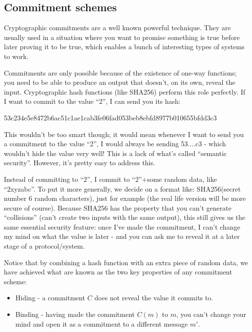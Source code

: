 \documentclass[10pt,a4paper]{article}
\providecommand{\tightlist}{%
  \setlength{\itemsep}{0pt}\setlength{\parskip}{0pt}}
\begin{document}
\hypertarget{commitment-schemes}{%
\subsection[Commitment
schemes]{\texorpdfstring{\protect\hypertarget{anchor-14}{}{}Commitment
schemes}{Commitment schemes}}\label{commitment-schemes}}

Cryptographic commitments are a well known powerful technique. They are
usually used in a situation where you want to promise something is true
before later proving it to be true, which enables a bunch of interesting
types of systems to work.

Commitments are only possible because of the existence of one-way
functions; you need to be able to produce an output that doesn't, on its own, reveal the input.
Cryptographic hash functions (like SHA256) perform this role perfectly. If I want to commit to the value ``2'', I can send you its hash:

53c234e5e8472b6ac51c1ae1cab3fe06fad053beb8ebfd8977b010655bfdd3c3

This wouldn't be too smart though; it would mean whenever I want to send
you a commitment to the value ``2'', I would always be sending 53....c3 - which wouldn't hide
the value very well! This is a lack of what's called ``semantic security''. However, it's pretty easy to address this.

Instead of committing to ``2'', I commit to ``2''+some random data, like
``2xyzabc''. To put it more generally, we decide on a format like: SHA256(secret number
\textbar{}\textbar{} 6 random characters), just for example (the real life version will be more secure of course). Because SHA256 has the property that you can't generate ``collisions'' (can't create two inputs with the same output), this still gives us the same essential security feature: once I've made the commitment, I can't change my mind on what the value is later - and you can ask me to reveal it at a later stage of a protocol/system.

Notice that by combining a hash function with an extra piece of random data, we have achieved what are known as the two key properties of any commitment scheme:

\begin{itemize}
\tightlist
\item
  Hiding - a commitment $C$ does not reveal the value it commits to.
\item
  Binding - having made the commitment $C(m)$ to $m$, you can't change your mind
  and open it as a commitment to a different message $m'$.
\end{itemize}
\end{document}
